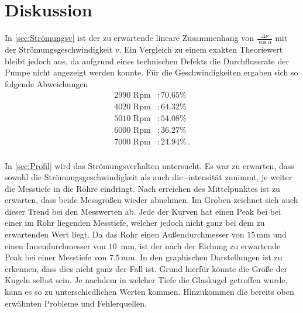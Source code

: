 \section{Diskussion}
\label{sec:Diskussion}

In \autoref{sec:Strömungsv} ist der zu erwartende lineare Zusammenhang von $\frac{\Delta \nu}{\cos \alpha}$ mit der Strömungsgeschwindigkeit $v$. Ein Vergleich zu einem exakten Theoriewert bleibt jedoch aus, 
da aufgrund eines technischen Defekts die Durchflussrate der Pumpe nicht angezeigt werden konnte. Für die Geschwindigkeiten ergaben sich so folgende Abweichungen
\begin{align*}
    2990 \text{ Rpm}&:70.65\%\\
    4020 \text{ Rpm}&:64.32\%\\
    5010 \text{ Rpm}&:54.08\%\\
    6000 \text{ Rpm}&:36.27\%\\
    7000 \text{ Rpm}&:24.94\%\, .\\
\end{align*}


In \autoref{sec:Profil} wird das Strömungsverhalten untersucht. Es war zu erwarten, dass sowohl die Strömungsgeschwindigkeit als auch die -intensität zunimmt, je weiter die Messtiefe in die Röhre eindringt.
Nach erreichen des Mittelpunktes ist zu erwarten, dass beide Messgrößen wieder abnehmen. Im Groben zeichnet sich auch dieser Trend bei den Messwerten ab. Jede der Kurven hat einen Peak bei bei einer im Rohr liegenden Messtiefe, welcher jedoch nicht ganz bei dem zu erwartenden Wert liegt.
Da das Rohr einen Außendurchmesser von $15\,$mm und einen Innendurchmesser von $10\,$ mm, ist der nach der Eichung zu erwartende Peak bei einer Messtiefe von $7.5\,$mm.
In den graphischen Darstellungen ist zu erkennen, dass dies nicht ganz der Fall ist. Grund hierfür könnte die Größe der Kugeln selbst sein. Je nachdem in welcher Tiefe die Glaskugel getroffen wurde, kann es so zu unterschiedlichen Werten kommen. 
Hinzukommen die bereits oben erwähnten Probleme und Fehlerquellen.
